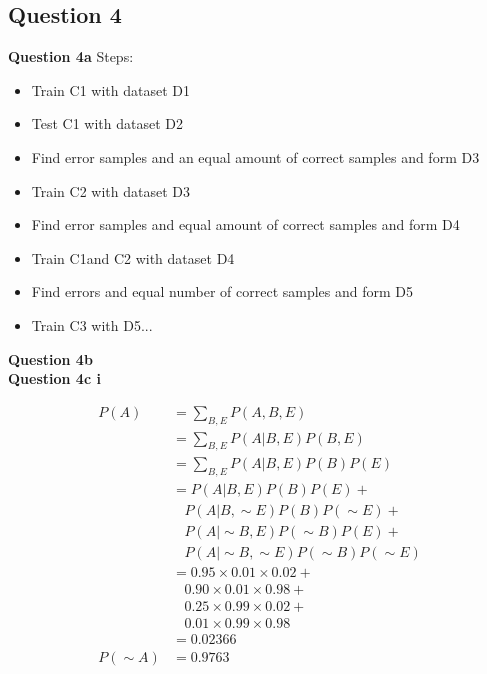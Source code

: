 \documentclass[11pt,a4paper]{report}
\begin{document}
\begin{multicols*}{2}
\section{Question 4}

\noindent \textbf{Question 4a}
 Steps:
\begin{itemize}
\item Train C1 with dataset D1
\item Test C1 with dataset D2
\item Find error samples and an equal amount of correct samples and form D3
\item Train C2 with dataset D3
\item Find error samples and equal amount of correct samples and form D4
\item Train C1and C2 with dataset D4
\item Find errors and equal number of correct samples and form D5
\item Train C3 with D5...
\end{itemize}

\noindent \textbf{Question 4b}
\\

\noindent \textbf{Question 4c i}

\begin{equation*}
\begin{split}
P(A) &= \sum_{B,E} P(A,B,E)\\
     &= \sum_{B,E} P(A | B,E) P(B,E)\\
     &= \sum_{B,E} P(A | B,E) P(B) P(E)\\
     &=       P(A |      B,     E) P(     B) P(     E) +\\
     &\ \ \ \ P(A |      B,\sim E) P(     B) P(\sim E) +\\
     &\ \ \ \ P(A | \sim B,     E) P(\sim B) P(     E) +\\
     &\ \ \ \ P(A | \sim B,\sim E) P(\sim B) P(\sim E)\\
     &=       0.95 \times 0.01 \times 0.02 +\\
     &\ \ \ \ 0.90 \times 0.01 \times 0.98 +\\
     &\ \ \ \ 0.25 \times 0.99 \times 0.02 +\\
     &\ \ \ \ 0.01 \times 0.99 \times 0.98  \\
     &= 0.02366\\
P(\sim A) &= 0.9763
\end{split}
\end{equation*}


\end{multicols*}
\end{document}
